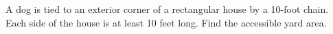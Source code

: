 A dog is tied to an exterior corner of a rectangular house by a 10-foot chain. Each side of the house is at least 10 feet long. Find the accessible yard area.
